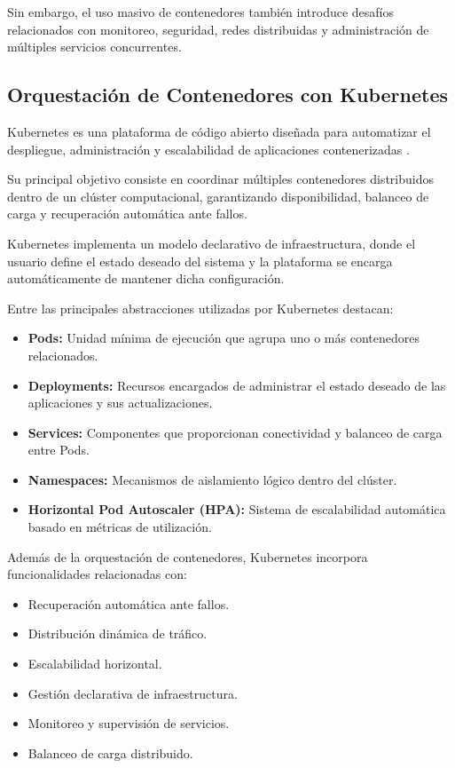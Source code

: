 Sin embargo, el uso masivo de contenedores también introduce desafíos relacionados con monitoreo, seguridad, redes distribuidas y administración de múltiples servicios concurrentes.

\subsection{Orquestación de Contenedores con Kubernetes}

Kubernetes es una plataforma de código abierto diseñada para automatizar el despliegue, administración y escalabilidad de aplicaciones contenerizadas \cite{59}.

Su principal objetivo consiste en coordinar múltiples contenedores distribuidos dentro de un clúster computacional, garantizando disponibilidad, balanceo de carga y recuperación automática ante fallos.

Kubernetes implementa un modelo declarativo de infraestructura, donde el usuario define el estado deseado del sistema y la plataforma se encarga automáticamente de mantener dicha configuración.

Entre las principales abstracciones utilizadas por Kubernetes destacan:

\begin{itemize}

\item \textbf{Pods:} Unidad mínima de ejecución que agrupa uno o más contenedores relacionados.

\item \textbf{Deployments:} Recursos encargados de administrar el estado deseado de las aplicaciones y sus actualizaciones.

\item \textbf{Services:} Componentes que proporcionan conectividad y balanceo de carga entre Pods.

\item \textbf{Namespaces:} Mecanismos de aislamiento lógico dentro del clúster.

\item \textbf{Horizontal Pod Autoscaler (HPA):} Sistema de escalabilidad automática basado en métricas de utilización.
\end{itemize}

Además de la orquestación de contenedores, Kubernetes incorpora funcionalidades relacionadas con:

\begin{itemize}
\item Recuperación automática ante fallos.
\item Distribución dinámica de tráfico.
\item Escalabilidad horizontal.
\item Gestión declarativa de infraestructura.
\item Monitoreo y supervisión de servicios.
\item Balanceo de carga distribuido.
\end{itemize}

